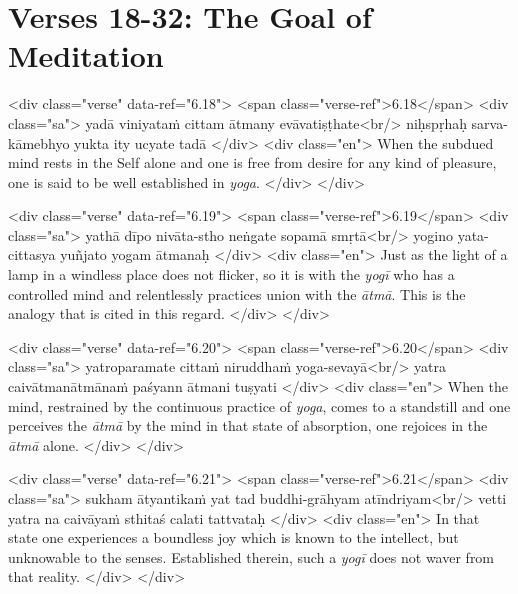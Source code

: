 \section{Verses 18-32: The Goal of Meditation}\label{sec-verses-18-32-the-goal-of-meditation}


\begin{html}
<div class="verse" data-ref="6.18">
  <span class="verse-ref">6.18</span>
  <div class="sa">
    yadā viniyataṁ cittam ātmany evāvatiṣṭhate<br/>
    niḥspṛhaḥ sarva-kāmebhyo yukta ity ucyate tadā
  </div>
  <div class="en">
    When the subdued mind rests in the Self alone and one is free from desire for any kind of pleasure, one is said to be well established in \textit{yoga}.
  </div>
</div>
\end{html}



\begin{html}
<div class="verse" data-ref="6.19">
  <span class="verse-ref">6.19</span>
  <div class="sa">
    yathā dīpo nivāta-stho neṅgate sopamā smṛtā<br/>
    yogino yata-cittasya yuñjato yogam ātmanaḥ
  </div>
  <div class="en">
    Just as the light of a lamp in a windless place does not flicker, so it is with the \textit{yogī} who has a controlled mind and relentlessly practices union with the \textit{ātmā}. This is the analogy that is cited in this regard.
  </div>
</div>
\end{html}



\begin{html}
<div class="verse" data-ref="6.20">
  <span class="verse-ref">6.20</span>
  <div class="sa">
    yatroparamate cittaṁ niruddhaṁ yoga-sevayā<br/>
    yatra caivātmanātmānaṁ paśyann ātmani tuṣyati
  </div>
  <div class="en">
    When the mind, restrained by the continuous practice of \textit{yoga}, comes to a standstill and one perceives the \textit{ātmā} by the mind in that state of absorption, one rejoices in the \textit{ātmā} alone.
  </div>
</div>
\end{html}



\begin{html}
<div class="verse" data-ref="6.21">
  <span class="verse-ref">6.21</span>
  <div class="sa">
    sukham ātyantikaṁ yat tad buddhi-grāhyam atīndriyam<br/>
    vetti yatra na caivāyaṁ sthitaś calati tattvataḥ
  </div>
  <div class="en">
    In that state one experiences a boundless joy which is known to the intellect, but unknowable to the senses. Established therein, such a \textit{yogī} does not waver from that reality.
  </div>
</div>
\end{html}



